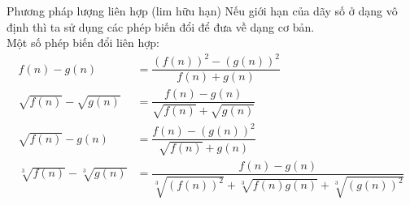 
\begin{dang}{Phương pháp lượng liên hợp (lim hữu hạn)}
	Nếu giới hạn của dãy số ở dạng vô định thì ta sử dụng các phép biến đổi để đưa về dạng cơ bản. \\
	Một số phép biến đổi liên hợp: \\
	\begin{align*}
		f(n) - g(n) &= \dfrac{(f(n))^2 - (g(n))^2}{f(n) + g(n)} \\
		\sqrt{f(n)} - \sqrt{g(n)} &= \dfrac{f(n) - g(n)}{\sqrt{f(n)} + \sqrt{g(n)}} \\
		\sqrt{f(n)} - g(n) &= \dfrac{f(n) - (g(n))^2}{\sqrt{f(n)} + g(n)} \\
		\sqrt[3]{f(n)} - \sqrt[3]{g(n)} &= \dfrac{f(n) - g(n)}{\sqrt[3]{(f(n))^2} + \sqrt[3]{f(n)g(n)} + \sqrt[3]{(g(n))^2}}
	\end{align*}
\end{dang}

